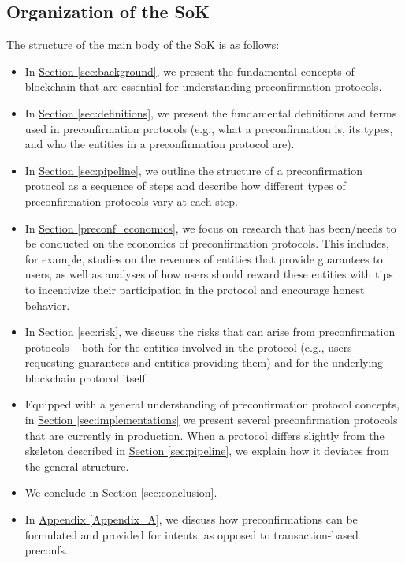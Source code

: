 \documentclass[a4paper]{article}
\theoremstyle{boldstyle}
\begin{document}
\subsection{Organization of the SoK}
The structure of the main body of the SoK is as follows:
\begin{itemize}
    \item In \hyperref[sec:background]{Section \ref{sec:background}}, we present the fundamental concepts of blockchain that are essential for understanding preconfirmation protocols.
    \item In \hyperref[sec:definitions]{Section \ref{sec:definitions}}, we present the fundamental definitions and terms used in preconfirmation protocols (e.g., what a preconfirmation is, its types, and who the entities in a preconfirmation protocol are). 
    \item In \hyperref[sec:pipeline]{Section \ref{sec:pipeline}}, we outline the structure of a preconfirmation protocol as a sequence of steps and describe how different types of preconfirmation protocols vary at each step.
    \item In \hyperref[preconf_economics]{Section \ref{preconf_economics}}, we focus on research that has been/needs to be conducted on the economics of preconfirmation protocols. This includes, for example, studies on the revenues of entities that provide guarantees to users, as well as analyses of how users should reward these entities with tips to incentivize their participation in the protocol and encourage honest behavior.
    \item In \hyperref[sec:risk]{Section \ref{sec:risk}}, we discuss the risks that can arise from preconfirmation protocols -- both for the entities involved in the protocol (e.g., users requesting guarantees and entities providing them) and for the underlying blockchain protocol itself.
    \item Equipped with a general understanding of preconfirmation protocol concepts, in \hyperref[sec:implementations]{Section \ref{sec:implementations}} we present several preconfirmation protocols that are currently in production. When a protocol differs slightly from the skeleton described in \hyperref[sec:pipeline]{Section \ref{sec:pipeline}}, we explain how it deviates from the general structure.
    \item We conclude in \hyperref[sec:conclusion]{Section \ref{sec:conclusion}}.
    \item In \hyperref[Appendix_A]{Appendix \ref{Appendix_A}}, we discuss how preconfirmations can be formulated and provided for intents, as opposed to transaction-based preconfs.
\end{itemize}
\end{document}
